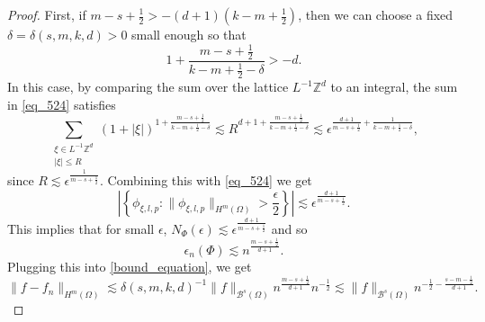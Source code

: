 \begin{proof}
 First, if $m-s+\frac{1}{2} > -(d+1)\left(k-m+\frac{1}{2}\right)$, then we can choose a fixed $\delta = \delta(s,m,k,d) > 0$ small enough so that 
 \begin{equation}
  1 + \frac{m-s+\frac{1}{2}}{k-m+\frac{1}{2}-\delta} > -d.
 \end{equation}
 In this case, by comparing the sum over the lattice $L^{-1}\mathbb{Z}^d$ to an integral, the sum in \eqref{eq_524} satisfies
 \begin{equation}
  \sum_{\substack{\xi\in L^{-1}\mathbb{Z}^d\\|\xi|\leq R}} (1+|\xi|)^{1 + \frac{m-s+\frac{1}{2}}{k-m+\frac{1}{2}-\delta}} \lesssim R^{d+1+\frac{m-s+\frac{1}{2}}{k-m+\frac{1}{2}-\delta}} \lesssim \epsilon^{\frac{d+1}{m-s+\frac{1}{2}} + \frac{1}{k-m+\frac{1}{2}-\delta}},
 \end{equation}
 since $R\lesssim \epsilon^{\frac{1}{m-s+\frac{1}{2}}}$. Combining this with \eqref{eq_524} we get
 \begin{equation}
  \left|\left\{\phi_{\xi,l,p}: \|\phi_{\xi,l,p}\|_{H^m(\Omega)} > \frac{\epsilon}{2}\right\}\right| \lesssim\epsilon^{\frac{d+1}{m-s+\frac{1}{2}}}.
 \end{equation}
 This implies that for small $\epsilon$, $N_\Phi(\epsilon)\lesssim \epsilon^{\frac{d+1}{m-s+\frac{1}{2}}}$ and so
 \begin{equation}
  \epsilon_n(\Phi) \lesssim n^{\frac{m-s+\frac{1}{2}}{d+1}}.
 \end{equation}
 Plugging this into \eqref{bound_equation}, we get
 \begin{equation}\label{eq_549}
  \|f - f_n\|_{H^m(\Omega)} \lesssim \delta(s,m,k,d)^{-1}\|f\|_{\mathcal{B}^s(\Omega)}n^{\frac{m-s+\frac{1}{2}}{d+1}}n^{-\frac{1}{2}}\lesssim \|f\|_{\mathcal{B}^s(\Omega)}n^{-\frac{1}{2}-\frac{s-m-\frac{1}{2}}{d+1}}.
 \end{equation}


\end{proof}
